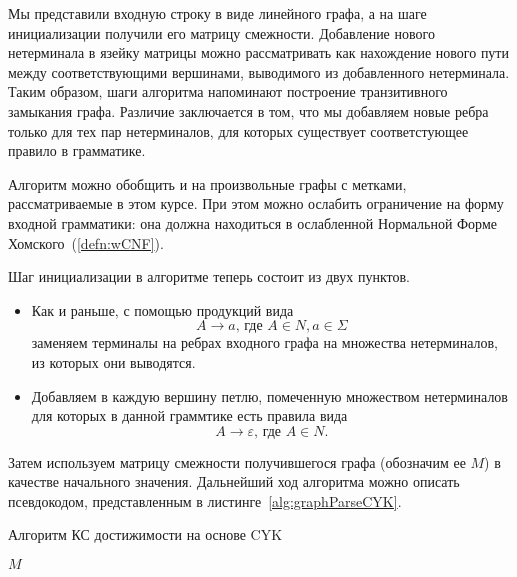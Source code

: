 Мы представили входную строку в виде линейного графа, а на шаге инициализации получили его матрицу смежности. Добавление нового нетерминала в язейку матрицы можно рассматривать как нахождение нового пути между соответствующими вершинами, выводимого из добавленного нетерминала. Таким образом, шаги алгоритма напоминают построение транзитивного замыкания графа. Различие заключается в том, что мы добавляем новые ребра только для тех пар нетерминалов, для которых существует соответстующее правило в грамматике.

Алгоритм можно обобщить и на произвольные графы с метками, рассматриваемые в этом курсе. При этом можно ослабить ограничение на форму входной грамматики: она должна находиться в ослабленной Нормальной Форме Хомского~(\ref{defn:wCNF}).

Шаг инициализации в алгоритме теперь состоит из двух пунктов.
\begin{itemize}
\item Как и раньше, с помощью продукций вида \[A \to a \text{, где } A \in N, a \in \Sigma\]
заменяем терминалы на ребрах входного графа на множества нетерминалов, из которых они выводятся.
\item  Добавляем в каждую вершину петлю, помеченную множеством нетерминалов для которых в данной граммтике есть правила вида $$A \to \varepsilon\text{, где } A \in N.$$
\end{itemize}

 Затем используем матрицу смежности получившегося графа (обозначим ее $M$) в качестве начального значения. Дальнейший ход алгоритма можно описать псевдокодом, представленным в листинге~\ref{alg:graphParseCYK}.

\begin{algorithm}[H]
    \begin{algorithmic}[1]
        \caption{Алгоритм КС достижимости на основе CYK}
        \label{alg:graphParseCYK}

                        \EndIf
                    \EndFor
                \EndFor
            \EndFor
        \EndFor
        \EndWhile
        \State \Return $M$
        \EndFunction
    \end{algorithmic}
\end{algorithm}

